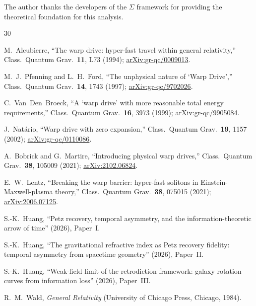 \documentclass[prd,twocolumn,superscriptaddress,longbibliography]{revtex4-2}
\begin{document}
\begin{acknowledgments}
The author thanks the developers of the $\Sigma$ framework
for providing the theoretical foundation for this analysis.
\end{acknowledgments}

\begin{thebibliography}{30}

M.~Alcubierre,
``The warp drive: hyper-fast travel within general relativity,''
Class.\ Quantum Grav.\ \textbf{11}, L73 (1994);
\href{https://arxiv.org/abs/gr-qc/0009013}{arXiv:gr-qc/0009013}.

M.~J.~Pfenning and L.~H.~Ford,
``The unphysical nature of `Warp Drive',''
Class.\ Quantum Grav.\ \textbf{14}, 1743 (1997);
\href{https://arxiv.org/abs/gr-qc/9702026}{arXiv:gr-qc/9702026}.

C.~Van~Den~Broeck,
``A `warp drive' with more reasonable total energy requirements,''
Class.\ Quantum Grav.\ \textbf{16}, 3973 (1999);
\href{https://arxiv.org/abs/gr-qc/9905084}{arXiv:gr-qc/9905084}.

J.~Nat\'{a}rio,
``Warp drive with zero expansion,''
Class.\ Quantum Grav.\ \textbf{19}, 1157 (2002);
\href{https://arxiv.org/abs/gr-qc/0110086}{arXiv:gr-qc/0110086}.

A.~Bobrick and G.~Martire,
``Introducing physical warp drives,''
Class.\ Quantum Grav.\ \textbf{38}, 105009 (2021);
\href{https://arxiv.org/abs/2102.06824}{arXiv:2102.06824}.

E.~W.~Lentz,
``Breaking the warp barrier: hyper-fast solitons in Einstein-Maxwell-plasma theory,''
Class.\ Quantum Grav.\ \textbf{38}, 075015 (2021);
\href{https://arxiv.org/abs/2006.07125}{arXiv:2006.07125}.

S.-K.~Huang,
``Petz recovery, temporal asymmetry, and the information-theoretic arrow of time''
(2026), Paper~I.

S.-K.~Huang,
``The gravitational refractive index as Petz recovery fidelity: temporal asymmetry from spacetime geometry''
(2026), Paper~II.

S.-K.~Huang,
``Weak-field limit of the retrodiction framework: galaxy rotation curves from information loss''
(2026), Paper~III.

R.~M.~Wald,
\emph{General Relativity}
(University of Chicago Press, Chicago, 1984).


\end{thebibliography}
\end{document}
